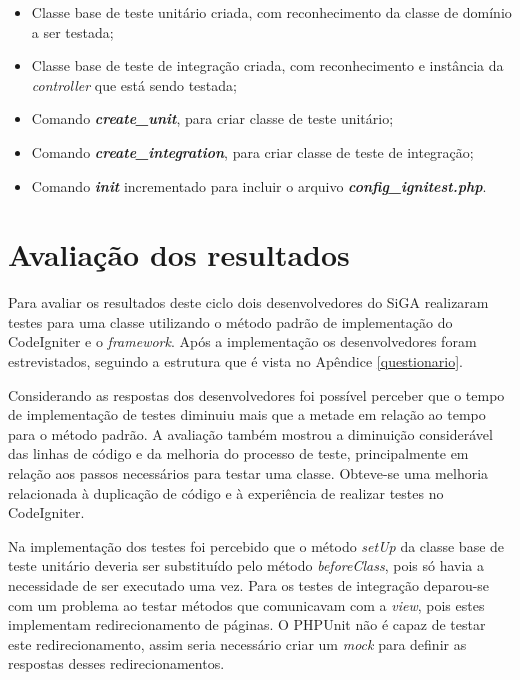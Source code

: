     \begin{itemize}

      \item Classe base de teste unitário criada, com reconhecimento da classe de domínio a ser testada;
      
      \item Classe base de teste de integração criada, com reconhecimento e instância da \textit{controller} que está sendo testada;
            
      \item Comando \textit{\textbf{create\_unit}}, para criar classe de teste unitário;

      \item Comando \textit{\textbf{create\_integration}}, para criar classe de teste de integração;
      
      \item Comando \textit{\textbf{init}} incrementado para incluir o arquivo \textit{\textbf{config\_ignitest.php}}.

    \end{itemize}
  
  \section{Avaliação dos resultados}

    Para avaliar os resultados deste ciclo dois desenvolvedores do SiGA realizaram testes para uma classe utilizando o método padrão de implementação do CodeIgniter e o \textit{framework}. Após a implementação os desenvolvedores foram estrevistados, seguindo a estrutura que é vista no Apêndice \ref{questionario}. 

    Considerando as respostas dos desenvolvedores foi possível perceber que o tempo de implementação de testes diminuiu mais que a metade em relação ao tempo para o método padrão. A avaliação também mostrou a diminuição considerável das linhas de código e da melhoria do processo de teste, principalmente em relação aos passos necessários para testar uma classe. Obteve-se uma melhoria relacionada à duplicação de código e à experiência de realizar testes no CodeIgniter. 
  
    Na implementação dos testes foi percebido que o método \textit{setUp} da classe base de teste unitário deveria ser substituído pelo método \textit{beforeClass}, pois só havia a necessidade
    de ser executado uma vez. Para os testes de integração deparou-se com um problema ao testar métodos que comunicavam com a \textit{view}, pois estes implementam redirecionamento de páginas. 
    O PHPUnit não é capaz de testar este redirecionamento, assim seria necessário criar um \textit{mock} para definir as respostas desses redirecionamentos. 

